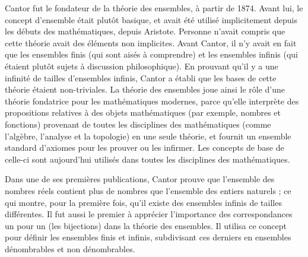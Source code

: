 \begin{His}
Cantor fut le fondateur de la théorie des ensembles, à partir de 1874. Avant lui, le concept d'ensemble était plutôt basique, et avait été utilisé implicitement depuis les débuts des mathématiques, depuis Aristote. Personne n'avait compris que cette théorie avait des éléments non implicites. Avant Cantor, il n'y avait en fait que les ensembles finis (qui sont aisés à comprendre) et les ensembles infinis (qui étaient plutôt sujets à discussion philosophique). En prouvant qu'il y a une infinité de tailles d'ensembles infinis, Cantor a établi que les bases de cette théorie étaient non-triviales. La théorie des ensembles joue ainsi le rôle d'une théorie fondatrice pour les mathématiques modernes, parce qu'elle interprète des propositions relatives à des objets mathématiques (par exemple, nombres et fonctions) provenant de toutes les disciplines des mathématiques (comme l'algèbre, l'analyse et la topologie) en une seule théorie, et fournit un ensemble standard d'axiomes pour les prouver ou les infirmer. Les concepts de base de celle-ci sont aujourd'hui utilisés dans toutes les disciplines des mathématiques.

\vspace{0.4cm}

Dans une de ses premières publications, Cantor prouve que l'ensemble des nombres réels contient plus de nombres que l'ensemble des entiers naturels ; ce qui montre, pour la première fois, qu'il existe des ensembles infinis de tailles différentes. Il fut aussi le premier à apprécier l'importance des correspondances un pour un (les bijections) dans la théorie des ensembles. Il utilisa ce concept pour définir les ensembles finis et infinis, subdivisant ces derniers en ensembles dénombrables et non dénombrables.

\end{His}